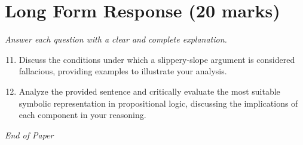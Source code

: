 \documentclass[12pt]{article}
\begin{document}
\section*{Long Form Response (20 marks)}
\textit{Answer each question with a clear and complete explanation.}
\begin{enumerate}[label=\arabic*.]
\setcounter{enumi}{10}
\item Discuss the conditions under which a slippery-slope argument is considered fallacious,
providing examples to illustrate your analysis.
\item Analyze the provided sentence and critically evaluate the most suitable symbolic
representation in propositional logic, discussing the implications of each component in
your reasoning.
\end{enumerate}

\vfill
\noindent\textit{End of Paper}
\end{document}
